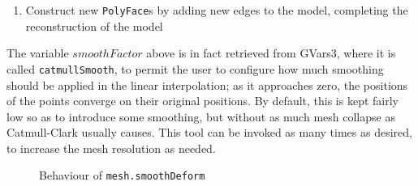 \documentclass[a4paper,10pt]{report}
\begin{document}
\begin{itemize}
{\begin{enumerate}
\item{Construct new \texttt{PolyFace}s by adding new edges to the model, completing the reconstruction of the model}
\end{enumerate}

The variable $smoothFactor$ above is in fact retrieved from GVars3, where it is called \texttt{catmullSmooth}, to permit the user to configure how much smoothing should be applied in the linear interpolation; as it approaches zero, the positions of the points converge on their original positions. By default, this is kept fairly low so as to introduce some smoothing, but without as much mesh collapse as Catmull-Clark usually causes. This tool can be invoked as many times as desired, to increase the mesh resolution as needed.
}

\begin{figure}
  \begin{center}
  \vspace{-80px}
  \caption{Behaviour of \texttt{mesh.smoothDeform}}
  \label{smoothdef}
  \end{center}
\end{figure}


\end{itemize}
\end{document}
